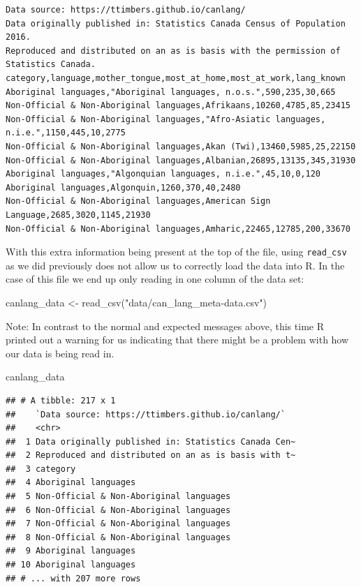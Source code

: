 \documentclass[
]{krantz}
\makeatletter
\newenvironment{Shaded}{\begin{snugshade}}{\end{snugshade}}
\newcommand{\FunctionTok}[1]{\textcolor[rgb]{0,0,0}{#1}}
\newcommand{\NormalTok}[1]{#1}
\newcommand{\OtherTok}[1]{\textcolor[rgb]{0.37,0.37,0.37}{#1}}
\newcommand{\StringTok}[1]{\textcolor[rgb]{0.5,0.5,0.5}{#1}}
\renewenvironment{quote}{\begin{VF}}{\end{VF}}
\newenvironment{kframe}{%
\medskip{}
\setlength{\fboxsep}{.8em}
 \def\at@end@of@kframe{}%
 \ifinner\ifhmode%
  \def\at@end@of@kframe{\end{minipage}}%
  \begin{minipage}{\columnwidth}%
 \fi\fi%
 \def\FrameCommand##1{\hskip\@totalleftmargin \hskip-\fboxsep
 \colorbox{shadecolor}{##1}\hskip-\fboxsep
     \hskip-\linewidth \hskip-\@totalleftmargin \hskip\columnwidth}%
 \MakeFramed {\advance\hsize-\width
   \@totalleftmargin\z@ \linewidth\hsize
   \@setminipage}}%
 {\par\unskip\endMakeFramed%
 \at@end@of@kframe}
\renewenvironment{Shaded}{\begin{kframe}}{\end{kframe}}
\makeatother
\begin{document}
\begin{verbatim}
Data source: https://ttimbers.github.io/canlang/
Data originally published in: Statistics Canada Census of Population 2016.
Reproduced and distributed on an as is basis with the permission of Statistics Canada.
category,language,mother_tongue,most_at_home,most_at_work,lang_known
Aboriginal languages,"Aboriginal languages, n.o.s.",590,235,30,665
Non-Official & Non-Aboriginal languages,Afrikaans,10260,4785,85,23415
Non-Official & Non-Aboriginal languages,"Afro-Asiatic languages, n.i.e.",1150,445,10,2775
Non-Official & Non-Aboriginal languages,Akan (Twi),13460,5985,25,22150
Non-Official & Non-Aboriginal languages,Albanian,26895,13135,345,31930
Aboriginal languages,"Algonquian languages, n.i.e.",45,10,0,120
Aboriginal languages,Algonquin,1260,370,40,2480
Non-Official & Non-Aboriginal languages,American Sign Language,2685,3020,1145,21930
Non-Official & Non-Aboriginal languages,Amharic,22465,12785,200,33670
\end{verbatim}

With this extra information being present at the top of the file, using \texttt{read\_csv} as we did previously does not allow us to correctly load the data into R. In the case of this file we end up only reading in one column of the data set:

\begin{Shaded}
\begin{Highlighting}[]
\NormalTok{canlang\_data }\OtherTok{\textless{}{-}} \FunctionTok{read\_csv}\NormalTok{(}\StringTok{"data/can\_lang\_meta{-}data.csv"}\NormalTok{)}
\end{Highlighting}
\end{Shaded}

\begin{quote}
Note: In contrast to the normal and expected messages above, this time R
printed out a warning for us indicating that there might be a problem with how
our data is being read in.
\end{quote}

\begin{Shaded}
\begin{Highlighting}[]
\NormalTok{canlang\_data}
\end{Highlighting}
\end{Shaded}

\begin{verbatim}
## # A tibble: 217 x 1
##    `Data source: https://ttimbers.github.io/canlang/`  
##    <chr>                                               
##  1 Data originally published in: Statistics Canada Cen~
##  2 Reproduced and distributed on an as is basis with t~
##  3 category                                            
##  4 Aboriginal languages                                
##  5 Non-Official & Non-Aboriginal languages             
##  6 Non-Official & Non-Aboriginal languages             
##  7 Non-Official & Non-Aboriginal languages             
##  8 Non-Official & Non-Aboriginal languages             
##  9 Aboriginal languages                                
## 10 Aboriginal languages                                
## # ... with 207 more rows
\end{verbatim}
\end{document}
